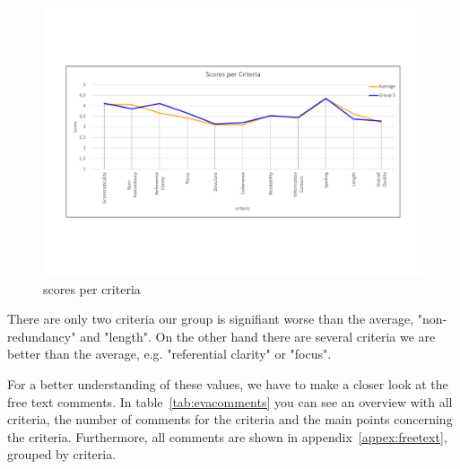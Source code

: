 \begin{figure}[H]
	\centering
	\includegraphics[trim=0 150 0 150, width=\textwidth]{img/scores_per_criteria.pdf}
	\caption{scores per criteria}
	\label{fig:spc}
\end{figure}

There are only two criteria our group is signifiant worse than the average, "non-redundancy" and "length". On the other hand there are several criteria we are better than the average, e.g. "referential clarity" or "focus".

For a better understanding of these values, we have to make a closer look at the free text comments.
In table~\ref{tab:evacomments} you can see an overview with all criteria, the number of comments for the criteria and the main points concerning the criteria. Furthermore, all comments are shown in appendix~\ref{appex:freetext}, grouped by criteria.

